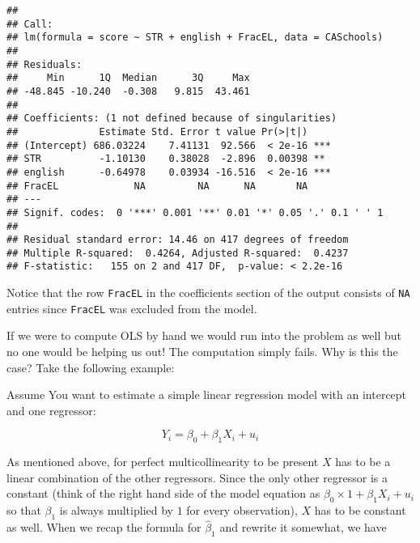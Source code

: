 \documentclass[]{book}
\newenvironment{Shaded}{\begin{snugshade}}{\end{snugshade}}
\newcommand{\KeywordTok}[1]{\textcolor[rgb]{0.13,0.29,0.53}{\textbf{#1}}}
\newcommand{\DataTypeTok}[1]{\textcolor[rgb]{0.13,0.29,0.53}{#1}}
\newcommand{\DecValTok}[1]{\textcolor[rgb]{0.00,0.00,0.81}{#1}}
\newcommand{\StringTok}[1]{\textcolor[rgb]{0.31,0.60,0.02}{#1}}
\newcommand{\CommentTok}[1]{\textcolor[rgb]{0.56,0.35,0.01}{\textit{#1}}}
\newcommand{\OperatorTok}[1]{\textcolor[rgb]{0.81,0.36,0.00}{\textbf{#1}}}
\newcommand{\NormalTok}[1]{#1}
\theoremstyle{definition}
\theoremstyle{definition}
\theoremstyle{definition}
\theoremstyle{remark}
\begin{document}
\begin{Shaded}
\end{Shaded}

\begin{verbatim}
## 
## Call:
## lm(formula = score ~ STR + english + FracEL, data = CASchools)
## 
## Residuals:
##     Min      1Q  Median      3Q     Max 
## -48.845 -10.240  -0.308   9.815  43.461 
## 
## Coefficients: (1 not defined because of singularities)
##              Estimate Std. Error t value Pr(>|t|)    
## (Intercept) 686.03224    7.41131  92.566  < 2e-16 ***
## STR          -1.10130    0.38028  -2.896  0.00398 ** 
## english      -0.64978    0.03934 -16.516  < 2e-16 ***
## FracEL             NA         NA      NA       NA    
## ---
## Signif. codes:  0 '***' 0.001 '**' 0.01 '*' 0.05 '.' 0.1 ' ' 1
## 
## Residual standard error: 14.46 on 417 degrees of freedom
## Multiple R-squared:  0.4264, Adjusted R-squared:  0.4237 
## F-statistic:   155 on 2 and 417 DF,  p-value: < 2.2e-16
\end{verbatim}

Notice that the row \texttt{FracEL} in the coefficients section of the
output consists of \texttt{NA} entries since \texttt{FracEL} was
excluded from the model.

If we were to compute OLS by hand we would run into the problem as well
but no one would be helping us out! The computation simply fails. Why is
this the case? Take the following example:

Assume You want to estimate a simple linear regression model with an
intercept and one regressor:

\[ Y_i = \beta_0 + \beta_1 X_i + u_i\]

As mentioned above, for perfect multicollinearity to be present \(X\)
has to be a linear combination of the other regressors. Since the only
other regressor is a constant (think of the right hand side of the model
equation as \(\beta_0 \times 1 + \beta_1 X_i + u_i\) so that \(\beta_1\)
is always multiplied by \(1\) for every observation), \(X\) has to be
constant as well. When we recap the formula for \(\hat\beta_1\) and
rewrite it somewhat, we have
\end{document}
